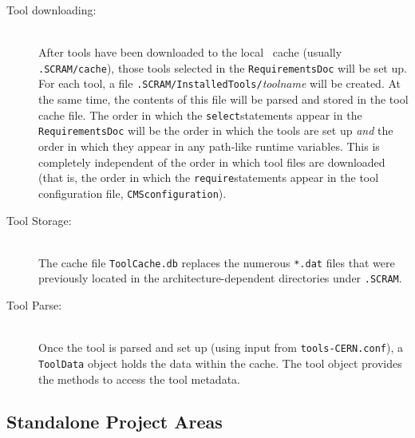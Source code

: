 \begin{description}
\item[Tool downloading:]\mbox{}\\ 
  After tools have been downloaded to the local \scram\ cache (usually
  \texttt{.SCRAM/cache}), those tools selected in the \texttt{RequirementsDoc} will be
  set up. For each tool, a file \texttt{.SCRAM/InstalledTools/}\textit{toolname} will
  be created. At the same time, the contents of this file will be
  parsed and stored in the tool cache file. The order in which the
  \lbkt\texttt{select}\rbkt statements appear in the \texttt{RequirementsDoc} will be the order
  in which the tools are set up \textit{and} the order in which they appear in
  any path-like runtime variables. This is completely independent of the
  order in which tool files are downloaded (that is, the order in
  which the \lbkt\texttt{require}\rbkt statements appear in the tool
  configuration file, \ie \texttt{CMSconfiguration}).
  
\item[Tool Storage:]\mbox{}\\ 
  The cache file \texttt{ToolCache.db} replaces the numerous \texttt{*.dat} files that were previously
  located in the architecture-dependent directories under \texttt{.SCRAM}. 

\item[Tool Parse:]\mbox{}\\ Once the tool is parsed and set up (using input from
  \texttt{tools-CERN.conf}), a \texttt{ToolData} object holds the
  data within the cache. The tool object provides the methods to access the
  tool metadata.

\end{description}

\subsection{Standalone Project Areas}

